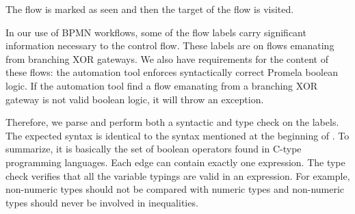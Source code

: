 The flow is marked as seen and then the target of the flow is visited. 

\begin{comment}
Because BPMN does not have rigorous execution semantics defined, there are some situations in BPMN where the function of an element is implied by the structure in which it is used. For example, gateways can either be forking gateways (with multiple outgoing flows) or joining gateways (with multiple incoming flows). This distinction is not addressed directly in the BPMN syntax. We handle this by splitting some traditional BPMN element classes into multiple element classes in the python intermediate representation. There is in the python representation, for example, both a "parallelGatewayJoinNode" class and a "parallelGatewayForkNode" class. This distinction is important because 
\end{comment}

In our use of BPMN workflows, some of the flow labels carry significant information necessary to the control flow. These labels are on flows emanating from branching XOR gateways. We also have requirements for the content of these flows: the automation tool enforces syntactically correct Promela boolean logic. If the automation tool find a flow emanating from a branching XOR gateway is not valid boolean logic, it will throw an exception.

Therefore, we parse and perform both a syntactic and type check on the labels. The expected syntax is identical to the syntax mentioned at the beginning of . To summarize, it is basically the set of boolean operators found in C-type programming languages. Each edge can contain exactly one expression. The type check verifies that all the variable typings are valid in an expression. For example, non-numeric types should not be compared with numeric types and non-numeric types should never be involved in inequalities.
